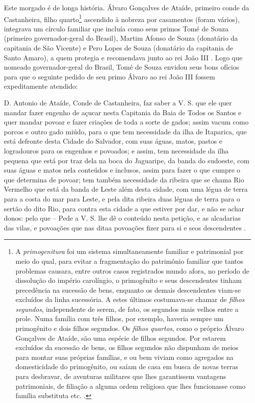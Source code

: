 Este morgado é de longa história. Álvaro Gonçalves de Ataíde, primeiro conde da Castanheira, filho quarto\footnote{A \textit{primogenitura} foi um sistema simultaneamente familiar e patrimonial por meio do qual, para evitar a fragmentação do patrimônio familiar que tantos problemas causara, entre outros casos registrados mundo afora, no período de dissolução do império carolíngio, o primogênito e seus descendentes tinham precedência na sucessão de bens, enquanto os demais descendentes viam-se excluídos da linha sucessória. A estes últimos costumava-se chamar de \textit{filhos segundos}, independente de serem, de fato, os segundos mais velhos entre a prole. Numa família com três filhos, por exemplo, haveria sempre um primogênito e dois filhos segundos. Os \textit{filhos quartos}, como o próprio Álvaro Gonçalves de Ataíde, são uma espécie de filhos segundos. Por estarem excluídos da sucessão de bens, os filhos segundos não dispunham de meios para montar suas próprias famílias, e ou bem viviam como agregados na domesticidade do primogênito, ou saíam de casa em busca de novas terras para desbravar, de aventuras militares que lhes garantissem vantagens patrimoniais, de filiação a alguma ordem religiosa que lhes funcionasse como família substituta etc. \cite{BERNARDO1997,coelho_vincular_1980} . } ascendido à nobreza por casamentos (foram vários), integrava um círculo familiar que incluía como seus primos Tomé de Souza (primeiro governador-geral do Brasil), Martim Afonso de Souza (donatário da capitania de São Vicente) e Pero Lopes de Souza (donatário da capitania de Santo Amaro), a quem protegia e recomendava junto ao rei João III \cite[p.~III-3]{teixeira_doacoes_1978}. Logo que nomeado governador-geral do Brasil, Tomé de Souza envidou seus bons ofícios para que o seguinte pedido de seu primo Álvaro ao rei João III fossem expeditamente atendido:

\begin{citacao}
D. Antonio de Ataíde, Conde de Castanheira, faz saber a V. S. que ele quer mandar fazer engenho de açucar nesta Capitania da Baia de Todos os Santos e quer mandar povoar e fazer criações de toda a sorte de gados; assim vacum como porcos e outro gado miúdo, para o que tem necessidade da ilha de Itaparica, que está defronte desta Cidade do Salvador, com suas águas, matos, pastos e logradouros para os engenhos e povoados; e assim, tem necessidade da ilha pequena que está por traz dela na boca do Jaguaripe, da banda do sudoeste, com suas águas e matos nela conteúdos e inclusos, assim para fazer o que cumpre o que determina de povoar; tem também necessidade da ribeira que se chama Rio Vermelho que está da banda de Leste além desta cidade, com uma légua de terra para a costa do mar para Leste, e pela dita ribeira duas léguas de terra para o sertão do dito Rio, para contra esta cidade a que estiver por dar, e não se achar donos: pelo que -- Pede a V. S. lhe dê o conteúdo nesta petição, e as alcadarias das vilas, e povoações que nas ditaa povoações fizer para si e seos descendentes \cite[p.~III-3]{teixeira_doacoes_1978}.
\end{citacao}

